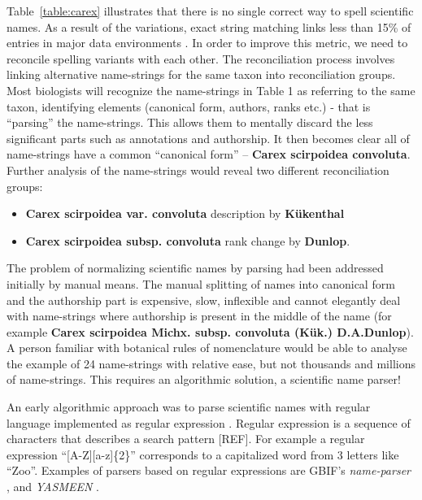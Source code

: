 \documentclass{bmcart}
\begin{document}
Table~\ref{table:carex} illustrates that
there is no single correct way to spell scientific names. As a result of the variations, exact string matching links less than 15\% of entries in major data
environments \cite{Patterson:inpress-a}. In order to improve this metric, we need to reconcile spelling variants with each other. The reconciliation process involves linking alternative name-strings for the same taxon into reconciliation
groups. Most biologists will recognize the name-strings in Table 1 as referring to the same taxon, identifying elements (canonical form, authors, ranks etc.) - that is ``parsing'' the name-strings.  This allows them to mentally discard the less significant parts such as annotations and authorship. It then becomes clear all of name-strings have a common ``canonical form'' -- \textbf{Carex scirpoidea convoluta}. Further
analysis of the name-strings would reveal two different reconciliation groups:

\begin{itemize}

  \item \textbf{Carex scirpoidea var. convoluta} description by
    \textbf{Kükenthal}

  \item \textbf{Carex scirpoidea subsp. convoluta} rank change by
    \textbf{Dunlop}.

\end{itemize}

The problem of normalizing scientific names by parsing had been addressed initially by manual means. The manual splitting of names into canonical form and the authorship part is expensive, slow, inflexible
and cannot elegantly deal with name-strings where authorship is present in the
middle of the name (for example \textbf{Carex scirpoidea Michx. subsp. convoluta
(Kük.) D.A.Dunlop}). A person familiar with botanical rules of nomenclature would be able to analyse the example of 24 name-strings with relative ease, but not thousands and millions of name-strings. This requires an algorithmic solution, a scientific name parser!

An early algorithmic approach was to parse scientific names with regular language
implemented as regular expression \cite{aho1992foundations}. Regular expression
is a sequence of characters that describes a search pattern [REF].  For example
a regular expression ``[A-Z][a-z]\{2\}'' corresponds to a capitalized word from
3 letters like ``Zoo''. Examples of parsers based on regular expressions are
GBIF's \textit{name-parser} \cite{gbifNameParser}, and \textit{YASMEEN}
\cite{VandenBerghe2015}.
\end{document}
